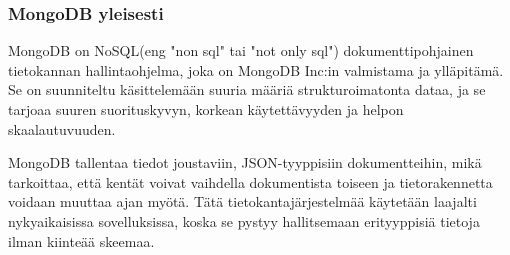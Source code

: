 







\subsubsection{MongoDB yleisesti}









MongoDB on NoSQL(eng "non sql"{} tai "not only sql"{}) dokumenttipohjainen tietokannan hallintaohjelma, joka on MongoDB Inc:in valmistama ja ylläpitämä.
Se on suunniteltu käsittelemään suuria määriä strukturoimatonta dataa, ja se tarjoaa suuren suorituskyvyn, korkean käytettävyyden ja helpon skaalautuvuuden. 
\medskip

MongoDB tallentaa tiedot joustaviin, JSON-tyyppisiin dokumentteihin, mikä tarkoittaa, että kentät voivat vaihdella dokumentista toiseen ja tietorakennetta voidaan muuttaa ajan myötä. 
Tätä tietokantajärjestelmää käytetään laajalti nykyaikaisissa sovelluksissa, koska se pystyy hallitsemaan erityyppisiä tietoja ilman kiinteää skeemaa.
\medskip



